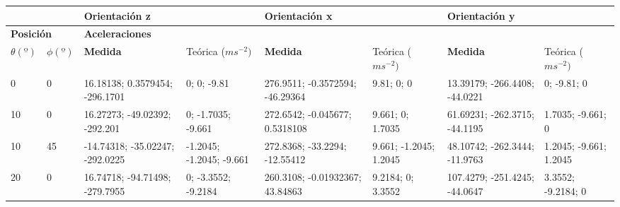 \documentclass[main]{subfiles}
\begin{document}
\begin{table}[H]
\centering
\begin{tiny}
\begin{tabular}{p{30pt}p{30pt}|p{40pt}|p{26pt}|p{40pt}|p{26pt}|p{40pt}|p{26pt}|}
\hhline{~~------}
&

& \multicolumn{2}{|p{79pt}|}{\cellcolor[gray]{0.5} \centering \textbf{Orientación z}}  
& \multicolumn{2}{|p{79.5pt}|}{\cellcolor[gray]{0.5} \centering \textbf{Orientación x}}
& \multicolumn{2}{|p{78.7pt}|}{\cellcolor[gray]{0.5} \centering \textbf{Orientación y}} \\ \hline 

  \multicolumn{2}{|p{72.5pt}|}{\cellcolor[gray]{0.6}  \centering\textbf{Posición}}  
& \multicolumn{6}{|p{262.8pt}|}{\cellcolor[gray]{0.6} \centering\textbf{Aceleraciones}}  \\ \hline
  \multicolumn{1}{|p{30pt}|}{\cellcolor[gray]{0.7} $\theta(º)$}
& \multicolumn{1}{|p{30pt}|}{\cellcolor[gray]{0.7} $\phi(º)$} 
& \multicolumn{1}{|p{40pt}|}{\cellcolor[gray]{0.8} \textbf{Medida}}  
& \multicolumn{1}{|p{26.2pt}|}{\cellcolor[gray]{0.7} Teórica ($ms^{-2})$ }
& \multicolumn{1}{|p{40pt}|}{\cellcolor[gray]{0.8} \textbf{Medida}}  
& \multicolumn{1}{|p{26.7pt}|}{\cellcolor[gray]{0.7} Teórica ($ms^{-2})$ }
& \multicolumn{1}{|p{40pt}|}{\cellcolor[gray]{0.8} \textbf{Medida}}  
& \multicolumn{1}{|p{26pt}|}{\cellcolor[gray]{0.7} Teórica ($ms^{-2})$ }
\\ \hline
\multicolumn{1}{|p{30pt}|}{0}  & 0  &  16.18138;    0.3579454;    -296.1701 &       0;          0;      -9.81 & 276.9511;      -0.3572594;    -46.29364 &   9.81;          0;         0 & 13.39179;    -266.4408;    -44.0221 &      0;      -9.81;         0\\ \hline
\multicolumn{1}{|p{30pt}|}{10} & 0  &  16.27273;    -49.02392;     -292.201 &       0;    -1.7035;     -9.661 & 272.6542;       -0.045677;    0.5318108 &  9.661;          0;    1.7035 & 61.69231;    -262.3715;    -44.1195 & 1.7035;     -9.661;         0\\ \hline
\multicolumn{1}{|p{30pt}|}{10} & 45 & -14.74318;    -35.02247;    -292.0225 & -1.2045;    -1.2045;     -9.661 & 272.8368;        -33.2294;    -12.55412 &  9.661;    -1.2045;    1.2045 & 48.10742;    -262.3444;    -11.9763 & 1.2045;     -9.661;    1.2045\\ \hline
\multicolumn{1}{|p{30pt}|}{20} & 0  &  16.74718;    -94.71498;    -279.7955 &       0;    -3.3552;    -9.2184 & 260.3108;     -0.01932367;     43.84863 & 9.2184;          0;    3.3552 & 107.4279;    -251.4245;    -44.0647 & 3.3552;    -9.2184;         0\\ \hline

\end{tabular}
\end{tiny}
\end{table}
\end{document}

